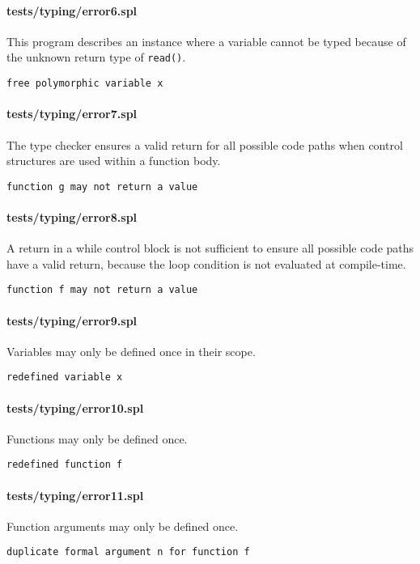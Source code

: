 \documentclass[a4paper]{article}
\begin{document}
\paragraph{tests/typing/error6.spl}
This program describes an instance where a variable cannot be typed because of the unknown return type of \verb|read()|.
    \begin{verbatim}
free polymorphic variable x\end{verbatim}

\paragraph{tests/typing/error7.spl}
The type checker ensures a valid return for all possible code paths when control structures are used within a function body.
    \begin{verbatim}
function g may not return a value\end{verbatim}

\paragraph{tests/typing/error8.spl}
A return in a while control block is not sufficient to ensure all possible code paths have a valid return, because the loop condition is not evaluated at compile-time.
    \begin{verbatim}
function f may not return a value\end{verbatim}

\paragraph{tests/typing/error9.spl}
Variables may only be defined once in their scope.
    \begin{verbatim}
redefined variable x\end{verbatim}

\paragraph{tests/typing/error10.spl}
Functions may only be defined once.
    \begin{verbatim}
redefined function f\end{verbatim}

\paragraph{tests/typing/error11.spl}
Function arguments may only be defined once.
    \begin{verbatim}
duplicate formal argument n for function f\end{verbatim}
\end{document}

